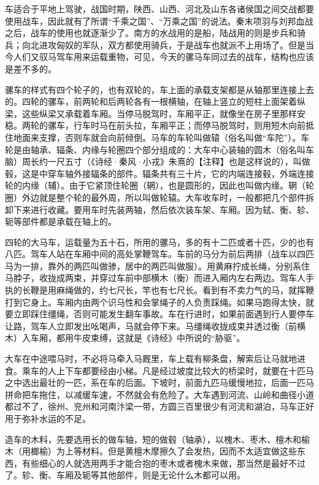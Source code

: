 \documentclass[12pt,UTF8]{ctexbook}
\begin{document}
车适合于平地上驾驶，战国时期，陕西、山西、河北及山东各诸侯国之间交战都要使用战车，因此就有了所谓“千乘之国”、“万乘之国”的说法。秦末项羽与刘邦血战之后，战车的使用也就逐渐少了。南方的水战用的是船，陆战用的则是步兵和骑兵；向北进攻匈奴的军队，双方都使用骑兵，于是战车也就派不上用场了。但是当今人们又驭马驾车用来运载重物，可见，今天的骡马车同过去的战车，结构也应该是差不多的。

骡车的样式有四个轮子的，也有双轮的，车上面的承载支架都是从轴那里连接上去的。四轮的骡车，前两轮和后两轮各有一根横轴，在轴上竖立的短柱上面架着纵梁，这些纵梁又承载着车厢。当停马脱驾时，车厢平正，就像坐在房子里那样安稳。两轮的骡车，行车时马在前头拉，车厢平正；而停马脱驾时，则用短木向前抵住地面来支撑，否则车就会向前倾倒。马车的车轮叫做辕（俗名叫做“车陀”）。车轮是由轴承、辐条、内缘与轮圈四个部分组成的：大车中心装轴的圆木（俗名叫车脑）周长约一尺五寸（《诗经·秦风·小戎》朱熹的【注释】也是这样说的），叫做毂，这是中穿车轴外接辐条的部件。辐条共有三十片，它的内端连接毂，外端连接轮的内缘（辅）。由于它紧顶住轮圈（辋），也是圆形的，因此也叫做内缘。辋（轮圈）外边就是整个轮的最外周，所以叫做轮辕。大车收车时，一般都把几个部件拆卸下来进行收藏。要用车时先装两轴，然后依次装车架、车厢。因为轼、衡、轸、轭等部件都是承载在轴上的。

四轮的大马车，运载量为五十石，所用的骡马，多的有十二匹或者十匹，少的也有八匹。驾车人站在车厢中间的高处掌鞭驾车。车前的马分为前后两排（战车以四匹马为一排，靠外的两匹叫做骖，居中的两匹叫做服）。用黄麻拧成长绳，分别系住马脖子，收拢成两束，并穿过车前中部横木（衡）而进入厢内左右两边。驾车人手执的长鞭是用麻绳做的，约七尺长，竿也有七尺长。看到有不卖力气的马，就挥鞭打到它身上。车厢内由两个识马性和会掌绳子的人负责踩绳。如果马跑得太快，就要立即踩住缰绳，否则可能发生翻车事故。车在行进时，如果前面遇到行人要停车让路，驾车人立即发出吆喝声，马就会停下来。马缰绳收拢成束并透过衡（前横木）入车厢，都用牛皮束缚，这就是《诗经》中所说的“胁驱”。

大车在中途喂马时，不必将马牵入马厩里，车上载有柳条盘，解索后让马就地进食。乘车的人上下车都要经由小梯。凡是经过坡度比较大的桥梁时，就要在十匹马之中选出最壮的一匹，系在车的后面。下坡时，前面九匹马缓慢地拉，后面一匹马拼命把车拖住，以减缓车速，不然就会有危险了。大车遇到河流、山岭和曲径小道都过不了，徐州、兖州和河南汴梁一带，方圆三百里很少有河流和湖泊，马车正好用于弥补水运的不足。

造车的木料，先要选用长的做车轴，短的做毂（轴承），以槐木、枣木、檀木和榆木（用榔榆）为上等材料。但是黄檀木摩擦久了会发热，因而不太适宜做这些东西，有些细心的人就选用两手才能合抱的枣木或者槐木来做，那当然是最好不过了。轸、衡、车厢及轭等其他部件，则是无论什么木都可以用。
\end{document}
